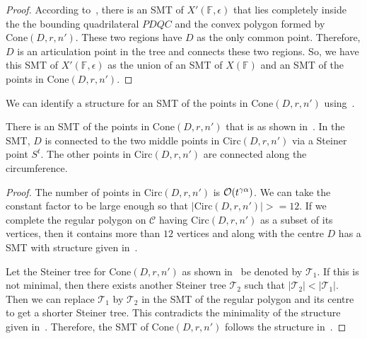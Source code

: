 \begin{proof}
    According to~, there is an SMT of $X'(\mathbb{F},\epsilon)$ that lies completely inside the the bounding quadrilateral $PDQC$ and the convex polygon formed by $\mathrm{Cone}(D,r,n')$. These two regions have $D$ as the only common point. Therefore, $D$ is an articulation point in the tree and connects these two regions. So, we have this SMT of $X'(\mathbb{F},\epsilon)$ as the union of an SMT of $X(\mathbb{F})$ and an SMT of the points in $\mathrm{Cone}(D,r,n')$.
\end{proof}

We can identify a structure for an SMT of the points in $\mathrm{Cone}(D,r,n')$ using~\cite{weng1995steiner}.
\begin{lemma}\label{thm:steiner_tree_part}
    There is an SMT of the points in $\mathrm{Cone}(D,r,n')$ that is as shown in~. In the SMT, $D$ is connected to the two middle points in $\mathrm{Circ}(D,r,n')$ via a Steiner point $S^t$. The other points in $\mathrm{Circ}(D,r,n')$ are connected along the circumference.
\end{lemma}

\begin{proof}
    The number of points in $\mathrm{Circ}(D,r,n')$ is $\mathcal{O}(t^{\gamma\alpha})$. We can take the constant factor to be large enough so that $|\mathrm{Circ}(D,r,n')| >= 12$. If we complete the regular polygon on $\mathcal{C}$ having $\mathrm{Circ}(D,r,n')$ as a subset of its vertices, then it contains more than $12$ vertices and along with the centre $D$ has a SMT with structure given in~\cite{weng1995steiner}.

    Let the Steiner tree for $\mathrm{Cone}(D,r,n')$ as shown in~ be denoted by $\mathcal{T}_1$. If this is not minimal, then there exists another Steiner tree $\mathcal{T}_2$ such that $|\mathcal{T}_2| < |\mathcal{T}_1|$. Then we can replace $\mathcal{T}_1$ by $\mathcal{T}_2$ in the SMT of the regular polygon and its centre to get a shorter Steiner tree. This contradicts the minimality of the structure given in~\cite{weng1995steiner}. Therefore, the SMT of $\mathrm{Cone}(D,r,n')$ follows the structure in~.
\end{proof}

